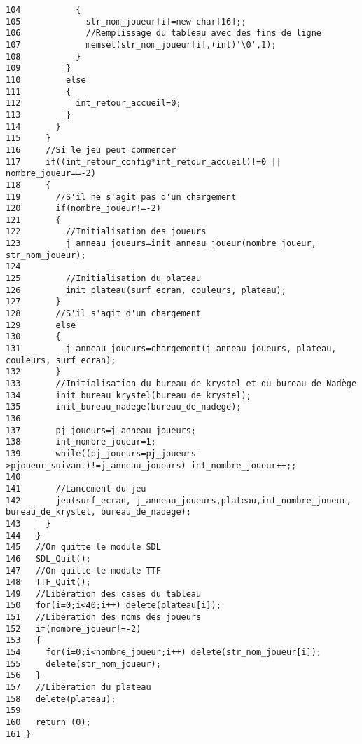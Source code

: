 \begin{Code}
\begin{verbatim}
104           {
105             str_nom_joueur[i]=new char[16];;
106             //Remplissage du tableau avec des fins de ligne
107             memset(str_nom_joueur[i],(int)'\0',1);
108           }
109         }
110         else
111         {
112           int_retour_accueil=0;
113         }
114       }
115     }
116     //Si le jeu peut commencer
117     if((int_retour_config*int_retour_accueil)!=0 || nombre_joueur==-2)
118     {
119       //S'il ne s'agit pas d'un chargement
120       if(nombre_joueur!=-2)
121       {
122         //Initialisation des joueurs
123         j_anneau_joueurs=init_anneau_joueur(nombre_joueur, str_nom_joueur);
124 
125         //Initialisation du plateau
126         init_plateau(surf_ecran, couleurs, plateau);
127       }
128       //S'il s'agit d'un chargement
129       else
130       {
131         j_anneau_joueurs=chargement(j_anneau_joueurs, plateau, couleurs, surf_ecran);
132       }
133       //Initialisation du bureau de krystel et du bureau de Nadège
134       init_bureau_krystel(bureau_de_krystel);
135       init_bureau_nadege(bureau_de_nadege);
136       
137       pj_joueurs=j_anneau_joueurs;
138       int_nombre_joueur=1;
139       while((pj_joueurs=pj_joueurs->pjoueur_suivant)!=j_anneau_joueurs) int_nombre_joueur++;;
140       
141       //Lancement du jeu
142       jeu(surf_ecran, j_anneau_joueurs,plateau,int_nombre_joueur, bureau_de_krystel, bureau_de_nadege);
143     }
144   }
145   //On quitte le module SDL
146   SDL_Quit();
147   //On quitte le module TTF
148   TTF_Quit();
149   //Libération des cases du tableau
150   for(i=0;i<40;i++) delete(plateau[i]);
151   //Libération des noms des joueurs
152   if(nombre_joueur!=-2)
153   {
154     for(i=0;i<nombre_joueur;i++) delete(str_nom_joueur[i]);
155     delete(str_nom_joueur);
156   }
157   //Libération du plateau
158   delete(plateau);
159 
160   return (0);
161 }
\end{verbatim}\end{Code}


